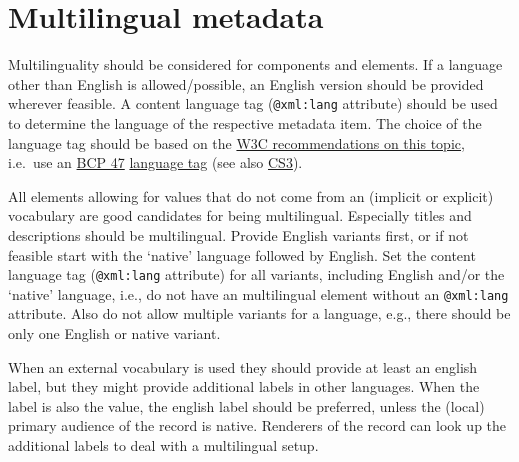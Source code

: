 \section{Multilingual metadata}\label{multilingual-metadata}

Multilinguality should be considered for components and elements. If a
language other than English is allowed/possible, an English version
should be provided wherever feasible. A content language tag
(\texttt{@xml:lang} attribute) should be used to determine the language
of the respective metadata item. The choice of the language tag should
be based on the
\href{https://www.w3.org/International/questions/qa-choosing-language-tags}{W3C
recommendations on this topic}, i.e.~use an
\href{https://tools.ietf.org/rfc/bcp/bcp47.txt}{BCP 47}
\href{https://www.iana.org/assignments/language-subtag-registry/language-subtag-registry}{language
tag} (see also
\href{/authoring_component_metadata_records/the_component_section.md\#cs3}{CS3}).

All elements allowing for values that do not come from an (implicit or
explicit) vocabulary are good candidates for being multilingual.
Especially titles and descriptions should be multilingual. Provide
English variants first, or if not feasible start with the `native'
language followed by English. Set the content language tag
(\texttt{@xml:lang} attribute) for all variants, including English
and/or the `native' language, i.e., do not have an multilingual element
without an \texttt{@xml:lang} attribute. Also do not allow multiple
variants for a language, e.g., there should be only one English or
native variant.

When an external vocabulary is used they should provide at least an
english label, but they might provide additional labels in other
languages. When the label is also the value, the english label should be
preferred, unless the (local) primary audience of the record is native.
Renderers of the record can look up the additional labels to deal with a
multilingual setup.
